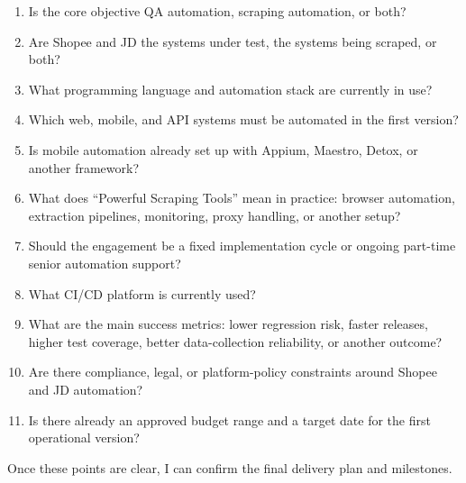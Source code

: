 \documentclass[11pt,a4paper]{article}
\begin{document}
\begin{enumerate}
\item Is the core objective QA automation, scraping automation, or both?
\item Are Shopee and JD the systems under test, the systems being scraped, or both?
\item What programming language and automation stack are currently in use?
\item Which web, mobile, and API systems must be automated in the first version?
\item Is mobile automation already set up with Appium, Maestro, Detox, or another framework?
\item What does ``Powerful Scraping Tools'' mean in practice: browser automation, extraction pipelines, monitoring, proxy handling, or another setup?
\item Should the engagement be a fixed implementation cycle or ongoing part-time senior automation support?
\item What CI/CD platform is currently used?
\item What are the main success metrics: lower regression risk, faster releases, higher test coverage, better data-collection reliability, or another outcome?
\item Are there compliance, legal, or platform-policy constraints around Shopee and JD automation?
\item Is there already an approved budget range and a target date for the first operational version?
\end{enumerate}

Once these points are clear, I can confirm the final delivery plan and milestones.\par
\end{document}

